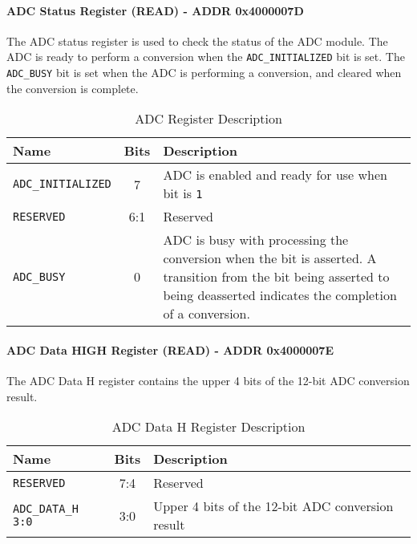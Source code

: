 \documentclass[main.tex]{subfiles}
\begin{document}
\paragraph{ADC Status Register (READ) - ADDR 0x4000007D}
The ADC status register is used to check the status of the ADC module. The ADC is ready to perform a conversion when the \texttt{ADC\_INITIALIZED} bit is set. The \texttt{ADC\_BUSY} bit is set when the ADC is performing a conversion, and cleared when the conversion is complete.
\begin{table}[h!]
    \centering
    \begin{tabular}{|l|c|p{10cm}|}
        \hline
        \textbf{Name} & \textbf{Bits} & \textbf{Description} \\ \hline
        \texttt{ADC\_INITIALIZED} & 7 & ADC is enabled and ready for use when bit is \texttt{1} \\ \hline
        \texttt{RESERVED} & 6:1 & Reserved \\ \hline
        \texttt{ADC\_BUSY} & 0 & ADC is busy with processing the conversion when the bit is asserted. A transition from the bit being asserted to being deasserted indicates the completion of a conversion. \\ \hline
    \end{tabular}
    \caption{ADC Register Description}
    \label{tab:adc_status_register}
\end{table}

\paragraph{ADC Data HIGH Register (READ) - ADDR 0x4000007E}
The ADC Data H register contains the upper 4 bits of the 12-bit ADC conversion result.
\begin{table}[h!]
    \centering
    \begin{tabular}{|l|c|p{10cm}|}
        \hline
        \textbf{Name} & \textbf{Bits} & \textbf{Description} \\ \hline
        \texttt{RESERVED} & 7:4 & Reserved \\ \hline
        \texttt{ADC\_DATA\_H 3:0} & 3:0 & Upper 4 bits of the 12-bit ADC conversion result \\ \hline
    \end{tabular}
    \caption{ADC Data H Register Description}
    \label{tab:adc_data_h_register}
\end{table}
\end{document}
